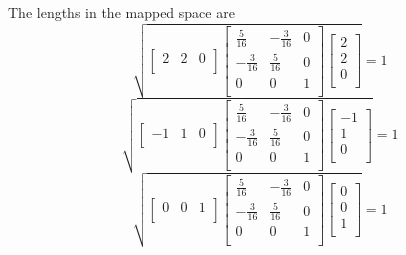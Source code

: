 \documentclass{article}
\begin{document}
The lengths in the mapped space are
\begin{equation}
 \sqrt{
 \left[\begin{array}{ccc}
   2&2&0\\
 \end{array}\right] 
 \left[\begin{array}{ccc}
   \frac{5}{16}&-\frac{3}{16}&0\\
   -\frac{3}{16}&\frac{5}{16}&0\\
   0&0&1\\
 \end{array}\right]
 \left[\begin{array}{c}
   2\\
   2\\
   0\\
 \end{array}\right]
 }=1
\end{equation}
\begin{equation}
 \sqrt{
 \left[\begin{array}{ccc}
   -1&1&0\\
 \end{array}\right] 
 \left[\begin{array}{ccc}
   \frac{5}{16}&-\frac{3}{16}&0\\
   -\frac{3}{16}&\frac{5}{16}&0\\
   0&0&1\\
 \end{array}\right]
 \left[\begin{array}{c}
   -1\\
   1\\
   0\\
 \end{array}\right]
 }=1
\end{equation}
\begin{equation}
 \sqrt{
 \left[\begin{array}{ccc}
   0&0&1\\
 \end{array}\right] 
 \left[\begin{array}{ccc}
   \frac{5}{16}&-\frac{3}{16}&0\\
   -\frac{3}{16}&\frac{5}{16}&0\\
   0&0&1\\
 \end{array}\right]
 \left[\begin{array}{c}
   0\\
   0\\
   1\\
 \end{array}\right]
 }=1
\end{equation}
\end{document}
